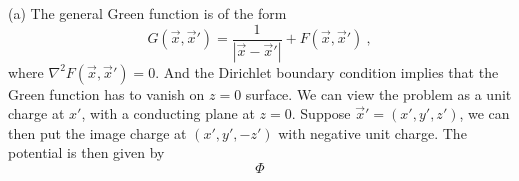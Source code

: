 \documentclass[12pt]{article}
\begin{document}
\newpage
{} (a) The general Green function is of the form
\begin{equation}
    G(\vec x, \vec x') = \frac{1}{|\vec x - \vec x'|} + F(\vec x, \vec x')~,
\end{equation}
where $\nabla^2 F(\vec x, \vec x') = 0$. And the Dirichlet boundary condition implies that the Green function has to vanish on $z = 0$ surface. We can view the problem as a unit charge at $x'$, with a conducting plane at $z = 0$. Suppose $\vec x' = (x', y', z')$, we can then put the image charge at $(x',y',-z')$ with negative unit charge. The potential is then given by
\begin{equation}
    \Phi
\end{equation}
\end{document}
